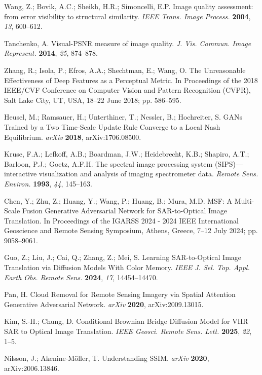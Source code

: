 Wang, Z.; Bovik, A.C.; Sheikh, H.R.; Simoncelli, E.P. Image quality assessment: from error visibility to structural similarity. {\em IEEE Trans. Image Process.} {\bf 2004}, {\em 13}, 600--612.

Tanchenko, A. Visual-PSNR measure of image quality. {\em J. Vis. Commun. Image Represent.} {\bf 2014}, {\em 25}, 874--878.

Zhang, R.; Isola, P.; Efros, A.A.; Shechtman, E.; Wang, O. The Unreasonable Effectiveness of Deep Features as a Perceptual Metric. In Proceedings of the 2018 IEEE/CVF Conference on Computer Vision and Pattern Recognition (CVPR), Salt Lake City, UT, USA, 18–22 June 2018; pp. 586--595.

Heusel, M.; Ramsauer, H.; Unterthiner, T.; Nessler, B.; Hochreiter, S. GANs Trained by a Two Time-Scale Update Rule Converge to a Local Nash Equilibrium. {\em arXiv} {\bf 2018}, arXiv:1706.08500.

Kruse, F.A.; Lefkoff, A.B.; Boardman, J.W.; Heidebrecht, K.B.; Shapiro, A.T.; Barloon, P.J.; Goetz, A.F.H. The spectral image processing system (SIPS)—interactive visualization and analysis of imaging spectrometer data. {\em Remote Sens. Environ.} {\bf 1993}, {\em 44}, 145--163.

Chen, Y.; Zhu, Z.; Huang, Y.; Wang, P.; Huang, B.; Mura, M.D. MSF: A Multi-Scale Fusion Generative Adversarial Network for SAR-to-Optical Image Translation. In Proceedings of the IGARSS 2024 - 2024 IEEE International Geoscience and Remote Sensing Symposium, Athens, Greece, 7–12 July 2024; pp. 9058--9061.

Guo, Z.; Liu, J.; Cai, Q.; Zhang, Z.; Mei, S. Learning SAR-to-Optical Image Translation via Diffusion Models With Color Memory. {\em IEEE J. Sel. Top. Appl. Earth Obs. Remote Sens.} {\bf 2024}, {\em 17}, 14454--14470.

Pan, H. Cloud Removal for Remote Sensing Imagery via Spatial Attention Generative Adversarial Network. {\em arXiv} {\bf 2020}, arXiv:2009.13015.

Kim, S.-H.; Chung, D. Conditional Brownian Bridge Diffusion Model for VHR SAR to Optical Image Translation. {\em IEEE Geosci. Remote Sens. Lett.} {\bf 2025}, {\em 22}, 1--5.

Nilsson, J.; Akenine-Möller, T. Understanding SSIM. {\em arXiv} {\bf 2020}, arXiv:2006.13846.

